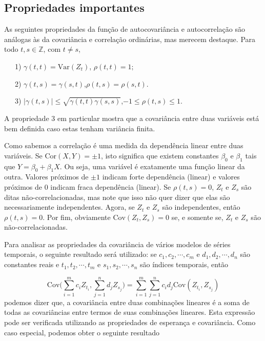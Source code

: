 \documentclass[
]{book}
\theoremstyle{definition}
\theoremstyle{definition}
\theoremstyle{definition}
\theoremstyle{remark}
\begin{document}
\hypertarget{propriedades-importantes}{%
\subsection{Propriedades importantes}\label{propriedades-importantes}}

As seguintes propriedades da função de autocovariância e autocorrelação são análogas às da covariância e correlação ordinárias, mas merecem destaque. Para todo \(t,s\in\mathbb{Z}\), com \(t\neq s\),

~~~1) \(\gamma(t,t) = \mbox{Var}(Z_t)\), \quad  \(\rho(t,t) = 1;\)

~~~2) \(\gamma(t,s) = \gamma(s,t)\),\quad \(\rho(t,s) = \rho(s,t)\).

~~~3) \(|\gamma(t,s)|\leq \sqrt{\gamma(t,t)\gamma(s,s)}\),\quad \(-1 \leq \rho(t,s)\leq 1.\)

A propriedade 3 em particular mostra que a covariância entre duas variáveis está bem definida caso estas tenham variância finita.

Como sabemos a correlação é uma medida da dependência linear entre duas variáveis. Se \(\mbox{Cor}(X,Y)=\pm1\), isto significa que existem constantes \(\beta_0\) e \(\beta_1\) tais que \(Y=\beta_0+\beta_1X\). Ou seja, uma variável é exatamente uma função linear da outra. Valores próximos de \(\pm 1\) indicam forte dependência (linear) e valores próximos de 0 indicam fraca dependência (linear). Se \(\rho(t,s) = 0\), \(Z_t\) e \(Z_s\) são ditas não-correlacionadas, mas note que isso não quer dizer que elas são necessariamente independentes. Agora, se \(Z_t\) e \(Z_s\) são independentes, então \(\rho(t,s) = 0\). Por fim, obviamente \(\mbox{Cov}(Z_t,Z_s)=0\) se, e somente se, \(Z_t\) e \(Z_s\) são não-correlacionadas.

Para analisar as propriedades da covariância de vários modelos de séries temporais, o seguinte resultado será utilizado: se \(c_1, c_2,\cdots, c_m\) e \(d_1, d_2,\cdots, d_n\) são constantes reais e \(t_1, t_2,\cdots, t_m\) e \(s_1, s_2,\cdots, s_n\) são índices temporais, então

\begin{equation}
\mbox{Cov}\bigg( \sum_{i=1}^{m}c_iZ_{t_i},\sum_{j=1}^{n}d_jZ_{s_j}\bigg) = \sum_{i=1}^{m}\sum_{j=1}^{n}c_i d_j \mbox{Cov} (Z_{t_i}, Z_{s_j})
\label{eq:covsum}
\end{equation}
podemos dizer que, a covariância entre duas combinações lineares é a soma de todas as covariâncias entre termos de suas combinações lineares. Esta expressão pode ser verificada utilizando as propriedades de esperança e covariância. Como caso especial, podemos obter o seguinte resultado
\end{document}
